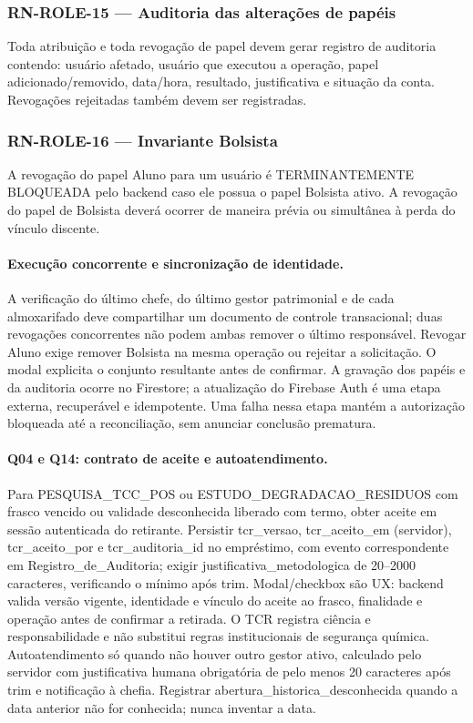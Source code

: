 \subsubsection{RN-ROLE-15 — Auditoria das alterações de papéis}
Toda atribuição e toda revogação de papel devem gerar registro de auditoria contendo: usuário afetado, usuário que executou a operação, papel adicionado/removido, data/hora, resultado, justificativa e situação da conta. Revogações rejeitadas também devem ser registradas.

\subsubsection{RN-ROLE-16 — Invariante Bolsista}
A revogação do papel Aluno para um usuário é TERMINANTEMENTE BLOQUEADA pelo backend caso ele possua o papel Bolsista ativo. A revogação do papel de Bolsista deverá ocorrer de maneira prévia ou simultânea à perda do vínculo discente.

\paragraph{Execução concorrente e sincronização de identidade.}
A verificação do último chefe, do último gestor patrimonial e de cada almoxarifado deve compartilhar um documento de controle transacional; duas revogações concorrentes não podem ambas remover o último responsável. Revogar Aluno exige remover Bolsista na mesma operação ou rejeitar a solicitação. O modal explicita o conjunto resultante antes de confirmar. A gravação dos papéis e da auditoria ocorre no Firestore; a atualização do Firebase Auth é uma etapa externa, recuperável e idempotente. Uma falha nessa etapa mantém a autorização bloqueada até a reconciliação, sem anunciar conclusão prematura.

\paragraph{Q04 e Q14: contrato de aceite e autoatendimento.}
Para PESQUISA\_TCC\_POS ou ESTUDO\_DEGRADACAO\_RESIDUOS com frasco vencido ou validade desconhecida liberado com termo, obter aceite em sessão autenticada do retirante. Persistir tcr\_versao, tcr\_aceito\_em (servidor), tcr\_aceito\_por e tcr\_auditoria\_id no empréstimo, com evento correspondente em Registro\_de\_Auditoria; exigir justificativa\_metodologica de 20--2000 caracteres, verificando o mínimo após trim. Modal/checkbox são UX: backend valida versão vigente, identidade e vínculo do aceite ao frasco, finalidade e operação antes de confirmar a retirada. O TCR registra ciência e responsabilidade e não substitui regras institucionais de segurança química. Autoatendimento só quando não houver outro gestor ativo, calculado pelo servidor com justificativa humana obrigatória de pelo menos 20 caracteres após trim e notificação à chefia. Registrar abertura\_historica\_desconhecida quando a data anterior não for conhecida; nunca inventar a data.

